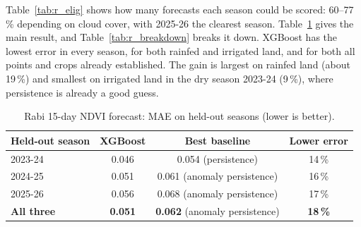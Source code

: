 \documentclass[11pt,a4paper,oneside]{article}
\begin{document}
Table~\ref{tab:r_elig} shows how many forecasts each season could be scored: 60--77\,\% depending on cloud cover, with 2025-26 the clearest season. Table~\ref{tab:rabi} gives the main result, and Table~\ref{tab:r_breakdown} breaks it down. XGBoost has the lowest error in every season, for both rainfed and irrigated land, and for both all points and crops already established. The gain is largest on rainfed land (about 19\,\%) and smallest on irrigated land in the dry season 2023-24 (9\,\%), where persistence is already a good guess.

\begin{table}[H]
\centering
\caption{Rabi 15-day NDVI forecast: MAE on held-out seasons (lower is better).}
\label{tab:rabi}
\small
\begin{tabular}{@{}lccc@{}}
\toprule
\textbf{Held-out season} & \textbf{XGBoost} & \textbf{Best baseline} & \textbf{Lower error} \\
\midrule
2023-24 & 0.046 & 0.054 (persistence) & 14\,\% \\
2024-25 & 0.051 & 0.061 (anomaly persistence) & 16\,\% \\
2025-26 & 0.056 & 0.068 (anomaly persistence) & 17\,\% \\
\textbf{All three} & \textbf{0.051} & \textbf{0.062} (anomaly persistence) & \textbf{18\,\%} \\
\bottomrule
\end{tabular}
\end{table}
\end{document}
